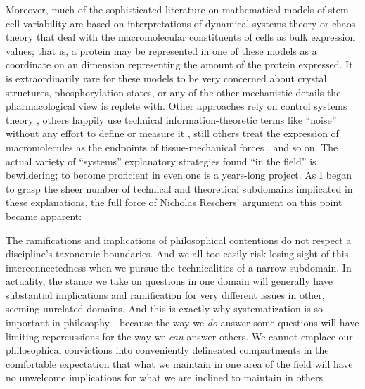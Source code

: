 Moreover, much of the sophisticated literature on mathematical models of stem cell variability are based on interpretations of dynamical systems theory or chaos theory \cite{Furusawa2012,Huang2017} that deal with the macromolecular constituents of cells as bulk expression values; that is, a protein may be represented in one of these models as a coordinate on an dimension representing the amount of the protein expressed. It is extraordinarily rare for these models to be very concerned about crystal structures, phosphorylation states, or any of the other mechanistic details the pharmacological view is replete with. Other approaches rely on control systems theory \cite{Sun2015,Yang2015a}, others happily use technical information-theoretic terms like ``noise'' without any effort to define or measure it \cite{Chang2008}, still others treat the expression of macromolecules as the endpoints of tissue-mechanical forces \cite{Peng2017}, and so on. The actual variety of ``systems'' explanatory strategies found ``in the field'' is bewildering; to become proficient in even one is a years-long project. As I began to grasp the sheer number of technical and theoretical subdomains implicated in these explanations, the full force of Nicholas Reschers' argument on this point became apparent: 

\begin{longquote}
The ramifications and implications of philosophical contentions do not respect a discipline's taxonomic boundaries. And we all too easily risk losing sight of this interconnectedness when we pursue the technicalities of a narrow subdomain. In actuality, the stance we take on questions in one domain will generally have substantial implications and ramification for very different issues in other, seeming unrelated domains. And this is exactly why systematization is so important in philosophy - because the way we \textit{do} answer some questions will have limiting repercussions for the way we \textit{can} answer others. We cannot emplace our philosophical convictions into conveniently delineated compartments in the comfortable expectation that what we maintain in one area of the field will have no unwelcome implications for what we are inclined to maintain in others.
\cite[p.97]{Rescher2005}
\end{longquote}

